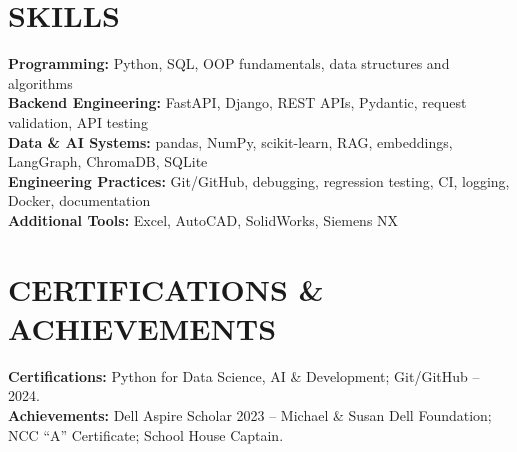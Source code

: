 \documentclass[10pt,a4paper]{article}
\begin{document}
\section*{SKILLS}
\textbf{Programming:} Python, SQL, OOP fundamentals, data structures and algorithms\\
\textbf{Backend Engineering:} FastAPI, Django, REST APIs, Pydantic, request validation, API testing\\
\textbf{Data \& AI Systems:} pandas, NumPy, scikit-learn, RAG, embeddings, LangGraph, ChromaDB, SQLite\\
\textbf{Engineering Practices:} Git/GitHub, debugging, regression testing, CI, logging, Docker, documentation\\
\textbf{Additional Tools:} Excel, AutoCAD, SolidWorks, Siemens NX

\section*{CERTIFICATIONS \& ACHIEVEMENTS}
{\fontsize{9.2pt}{10.2pt}\selectfont
\textbf{Certifications:} Python for Data Science, AI \& Development; Git/GitHub -- 2024.\\[-1pt]
\textbf{Achievements:} Dell Aspire Scholar 2023 -- Michael \& Susan Dell Foundation; NCC ``A'' Certificate; School House Captain.
}
\end{document}
